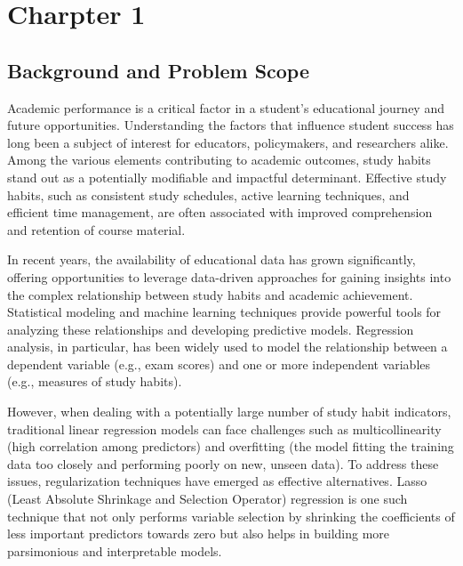 \documentclass[a4paper,12pt]{article}
\begin{document}
\newpage	
\section {Charpter 1 }
	\subsection{Background and Problem Scope}
	 Academic performance is a critical factor in a student's educational journey and future opportunities. Understanding the factors that influence student success has long been a subject of interest for educators, policymakers, and researchers alike. Among the various elements contributing to academic outcomes, study habits stand out as a potentially modifiable and impactful determinant. Effective study habits, such as consistent study schedules, active learning techniques, and efficient time management, are often associated with improved comprehension and retention of course material.
	
	In recent years, the availability of educational data has grown significantly, offering opportunities to leverage data-driven approaches for gaining insights into the complex relationship between study habits and academic achievement. Statistical modeling and machine learning techniques provide powerful tools for analyzing these relationships and developing predictive models. Regression analysis, in particular, has been widely used to model the relationship between a dependent variable (e.g., exam scores) and one or more independent variables (e.g., measures of study habits).
	
	However, when dealing with a potentially large number of study habit indicators, traditional linear regression models can face challenges such as multicollinearity (high correlation among predictors) and overfitting (the model fitting the training data too closely and performing poorly on new, unseen data). To address these issues, regularization techniques have emerged as effective alternatives. Lasso (Least Absolute Shrinkage and Selection Operator) regression is one such technique that not only performs variable selection by shrinking the coefficients of less important predictors towards zero but also helps in building more parsimonious and interpretable models.
	
\end{document}

